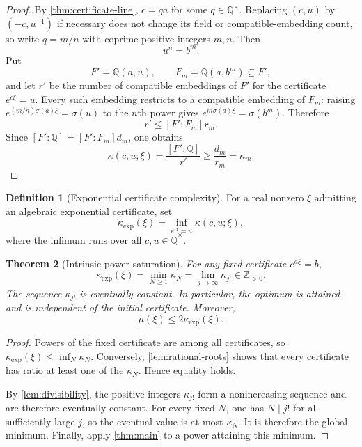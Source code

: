 \documentclass[11pt]{article}
\newcommand{\QQ}{\mathbb Q}
\newcommand{\ZZ}{\mathbb Z}
\newcommand{\Qbar}{\overline{\mathbb Q}}
\newtheorem{theorem}{Theorem}[section]
\theoremstyle{definition}
\newtheorem{definition}[theorem]{Definition}
\theoremstyle{remark}
\numberwithin{equation}{section}
\begin{document}
\begin{proof}
By \cref{thm:certificate-line}, $c=qa$ for some
$q\in\QQ^\times$.  Replacing $(c,u)$ by $(-c,u^{-1})$ if necessary
does not change its field or compatible-embedding count, so write
$q=m/n$ with coprime positive integers $m,n$.  Then
\[
 u^n=b^m.
\]
Put
\[
 F'=\QQ(a,u),
 \qquad
 F_m=\QQ(a,b^m)\subseteq F',
\]
and let $r'$ be the number of compatible embeddings of $F'$ for the
certificate $e^{c\xi}=u$.  Every such embedding restricts to a
compatible embedding of $F_m$: raising
$e^{(m/n)\sigma(a)\xi}=\sigma(u)$ to the $n$th power gives
$e^{m\sigma(a)\xi}=\sigma(b^m)$.  Therefore
\[
 r'\le[F':F_m]r_m.
\]
Since $[F':\QQ]=[F':F_m]d_m$, one obtains
\[
 \kappa(c,u;\xi)=\frac{[F':\QQ]}{r'}
 \ge\frac{d_m}{r_m}=\kappa_m.
\]
\end{proof}

\begin{definition}[Exponential certificate complexity]
\label{def:kappa-exp}
For a real nonzero $\xi$ admitting an algebraic exponential certificate,
set
\[
 \kappa_{\exp}(\xi)=
 \inf_{e^{c\xi}=u}\kappa(c,u;\xi),
\]
where the infimum runs over all $c,u\in\Qbar^\times$.
\end{definition}

\begin{theorem}[Intrinsic power saturation]\label{thm:intrinsic-kappa}
For any fixed certificate $e^{a\xi}=b$,
\[
 \boxed{
 \kappa_{\exp}(\xi)
 =\min_{N\ge1}\kappa_N
 =\lim_{j\to\infty}\kappa_{j!}
 \in\ZZ_{>0}.}
\]
The sequence $\kappa_{j!}$ is eventually constant.  In particular,
the optimum is attained and is independent of the initial certificate.
Moreover,
\[
 \boxed{\mu(\xi)\le2\kappa_{\exp}(\xi).}
\]
\end{theorem}

\begin{proof}
Powers of the fixed certificate are among all certificates, so
$\kappa_{\exp}(\xi)\le\inf_N\kappa_N$.  Conversely,
\cref{lem:rational-roots} shows that every certificate has ratio at
least one of the $\kappa_N$.  Hence equality holds.

By \cref{lem:divisibility}, the positive integers $\kappa_{j!}$ form a
nonincreasing sequence and are therefore eventually constant.  For
every fixed $N$, one has $N\mid j!$ for all sufficiently large $j$, so
the eventual value is at most $\kappa_N$.  It is therefore the global
minimum.  Finally, apply \cref{thm:main} to a power attaining this
minimum.
\end{proof}
\end{document}
